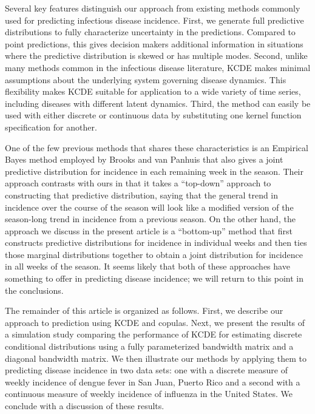 \documentclass[times, doublespace]{simauth}\usepackage[]{graphicx}\usepackage[]{color}
\begin{document}
Several key features distinguish our approach from existing methods commonly
used for predicting infectious disease incidence.
First, we generate full predictive distributions to fully
characterize uncertainty in the predictions.
Compared to point predictions, this gives decision makers additional information in
situations where the predictive distribution is skewed or has multiple modes.
Second, unlike many methods common in the infectious disease literature,
KCDE makes minimal assumptions about the
underlying system governing disease dynamics. This flexibility makes KCDE
suitable for application to a wide variety of time series, including diseases
with different latent dynamics.
Third, the method can easily be used with either discrete or continuous data
by substituting one kernel function specification for another.

One of the few previous methods that shares these characteristics is an
Empirical Bayes method employed by Brooks \etal \cite{brooks2015empiricalBayes}
and van Panhuis \etal \cite{vanPanhuis2014riskDengueBrazil} that also gives
a joint predictive distribution for incidence in each remaining week in the season.
Their approach contrasts with ours in that it takes a ``top-down'' approach to
constructing that predictive distribution, saying that the general trend in
incidence over the course of the season will look like a modified version of the
season-long trend in incidence from a previous season.  On the other hand, the approach
we discuss in the present article is a ``bottom-up'' method that first constructs
predictive distributions for incidence in individual weeks and then ties those
marginal distributions together to obtain a joint distribution for incidence in all
weeks of the season.  It seems likely that both of these approaches have something to
offer in predicting disease incidence; we will return to this point in the conclusions.

The remainder of this article is organized as follows.  First, we describe our
approach to prediction using KCDE and copulas.  Next, we present the
results of a simulation study comparing the performance of KCDE for
estimating discrete conditional distributions using a fully parameterized
bandwidth matrix and a diagonal bandwidth matrix.  We then illustrate our methods by applying them to predicting
disease incidence in two data sets: one with a discrete measure
of weekly incidence of dengue fever in San Juan, Puerto Rico and a
second with a continuous measure of weekly incidence of influenza in the United
States.  We conclude with a discussion of these results.
\end{document}
